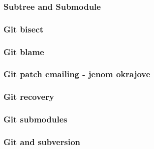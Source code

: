 \begin{frame}
	\frametitle{Subtree and Submodule}
\end{frame}

\begin{frame}
	\frametitle{Git bisect}
\end{frame}

\begin{frame}
	\frametitle{Git blame}
\end{frame}

\begin{frame}
	\frametitle{Git patch emailing - jenom okrajove}
\end{frame}

\begin{frame}
	\frametitle{Git recovery}
\end{frame}

\begin{frame}
	\frametitle{Git submodules}
\end{frame}

\begin{frame}
	\frametitle{Git and subversion}
\end{frame}



